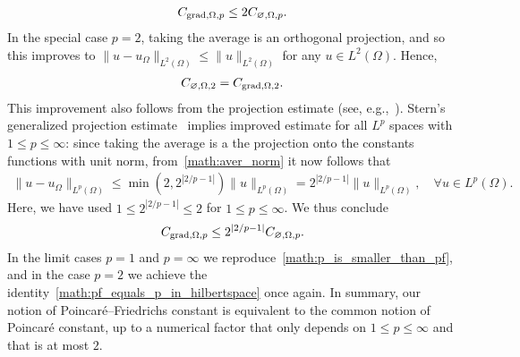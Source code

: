 \documentclass[10pt,a4paper]{article}
\begin{document}
\begin{align}\label{math:p_is_smaller_than_pf}
    C_{\operatorname{grad},\Omega,p} \leq 2 C_{\varnothing,\Omega,p}.
\end{align}
In the special case $p=2$, taking the average is an orthogonal projection, 
and so this improves to $\| u - u_\Omega \|_{L^{2}(\Omega)} \leq \| u \|_{L^{2}(\Omega)}$ for any $u \in L^{2}(\Omega)$. 
Hence,
\begin{align}\label{math:pf_equals_p_in_hilbertspace}
    C_{\varnothing,\Omega,2} = C_{\operatorname{grad},\Omega,2}. 
\end{align}
This improvement also follows from the projection estimate (see, e.g.,~\cite{xu2003some}).
Stern's generalized projection estimate~\cite[Theorem~4.1,Remark~5.1]{stern2015banach} implies improved estimate for all $L^{p}$ spaces with $1 \leq p \leq \infty$:
since taking the average is a the projection onto the constants functions with unit norm, from~\eqref{math:aver_norm} it now follows that 
\begin{align*}
    \| u - u_\Omega \|_{L^{p}(\Omega)}
    \leq 
    \min\left( 2, 2^{|2/p-1|} \right)
    \| u \|_{L^{p}(\Omega)}
    = 
    2^{|2/p-1|} 
    \| u \|_{L^{p}(\Omega)}
    ,
    \quad 
    \forall 
    u \in L^{p}(\Omega)
    .
\end{align*}
Here, we have used $1 \leq 2^{|2/p-1|} \leq 2$ for $1 \leq p \leq \infty$.
We thus conclude 
\begin{align}\label{math:p_vs_pf}
    C_{\operatorname{grad},\Omega,p} \leq 2^{|2/p-1|} C_{\varnothing,\Omega,p}.
\end{align}
In the limit cases $p = 1$ and $p = \infty$ we reproduce~\eqref{math:p_is_smaller_than_pf}, 
and in the case $p = 2$ we achieve the identity~\eqref{math:pf_equals_p_in_hilbertspace} once again.
In summary, our notion of Poincar\'e--Friedrichs constant is equivalent to the common notion of Poincar\'e constant, up to a numerical factor that only depends on $1 \leq p \leq \infty$ and that is at most $2$.
\end{document}
